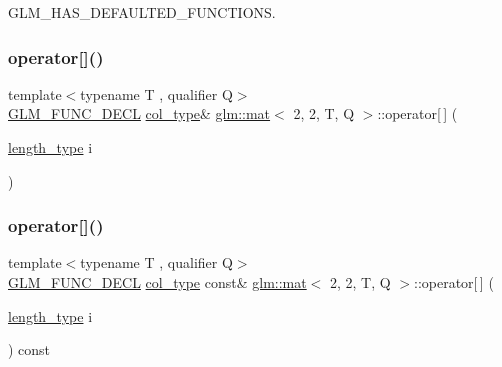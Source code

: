 G\+L\+M\+\_\+\+H\+A\+S\+\_\+\+D\+E\+F\+A\+U\+L\+T\+E\+D\+\_\+\+F\+U\+N\+C\+T\+I\+O\+NS. 

\mbox{\label{structglm_1_1mat_3_012_00_012_00_01_t_00_01_q_01_4_a3412817642a709f843240b51f05514a5}} 
\subsubsection{\texorpdfstring{operator[]()}{operator[]()}\hspace{0.1cm}{\footnotesize\ttfamily [1/2]}}
{\footnotesize\ttfamily template$<$typename T , qualifier Q$>$ \\
\mbox{\hyperlink{setup_8hpp_ab2d052de21a70539923e9bcbf6e83a51}{G\+L\+M\+\_\+\+F\+U\+N\+C\+\_\+\+D\+E\+CL}} \mbox{\hyperlink{structglm_1_1mat_3_012_00_012_00_01_t_00_01_q_01_4_a2983591534ee443dd378cedcbe771749}{col\+\_\+type}}\& \mbox{\hyperlink{structglm_1_1mat}{glm\+::mat}}$<$ 2, 2, T, Q $>$\+::operator\mbox{[}$\,$\mbox{]} (\begin{DoxyParamCaption}\item[{\mbox{\hyperlink{structglm_1_1mat_3_012_00_012_00_01_t_00_01_q_01_4_a96c65b091fc8fe8e6f5637e30c9c1f81}{length\+\_\+type}}}]{i }\end{DoxyParamCaption})}

\mbox{\label{structglm_1_1mat_3_012_00_012_00_01_t_00_01_q_01_4_a06ff5b61af6353d73db79acd46534b0c}} 
\subsubsection{\texorpdfstring{operator[]()}{operator[]()}\hspace{0.1cm}{\footnotesize\ttfamily [2/2]}}
{\footnotesize\ttfamily template$<$typename T , qualifier Q$>$ \\
\mbox{\hyperlink{setup_8hpp_ab2d052de21a70539923e9bcbf6e83a51}{G\+L\+M\+\_\+\+F\+U\+N\+C\+\_\+\+D\+E\+CL}} \mbox{\hyperlink{structglm_1_1mat_3_012_00_012_00_01_t_00_01_q_01_4_a2983591534ee443dd378cedcbe771749}{col\+\_\+type}} const\& \mbox{\hyperlink{structglm_1_1mat}{glm\+::mat}}$<$ 2, 2, T, Q $>$\+::operator\mbox{[}$\,$\mbox{]} (\begin{DoxyParamCaption}\item[{\mbox{\hyperlink{structglm_1_1mat_3_012_00_012_00_01_t_00_01_q_01_4_a96c65b091fc8fe8e6f5637e30c9c1f81}{length\+\_\+type}}}]{i }\end{DoxyParamCaption}) const}



